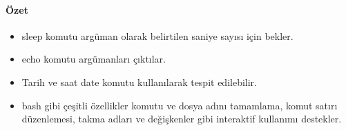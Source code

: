 \paragraph{Özet}{
\begin{itemize}
\item sleep komutu argüman olarak belirtilen saniye sayısı için bekler.
\item echo komutu argümanları çıktılar.
\item Tarih ve saat date komutu kullanılarak tespit edilebilir.
\item bash gibi çeşitli özellikler komutu ve dosya adını tamamlama, komut satırı düzenlemesi, takma adları ve değişkenler gibi interaktif kullanımı destekler.
\end{itemize}
}